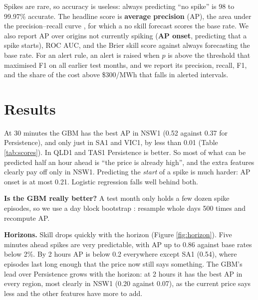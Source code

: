 Spikes are rare, so accuracy is useless: always predicting ``no spike'' is 98 to 99.97\% accurate. The headline score is
\textbf{average precision} (AP), the area under the precision--recall curve \cite{saito2015}, for which a no skill forecast scores
the base rate. We also report AP over origins not currently spiking (\textbf{AP onset}, predicting that a spike starts), ROC AUC,
and the Brier skill score against always forecasting the base rate. For an alert rule, an alert is raised when
$p$ is above the threshold that maximised F1 on all earlier test months, and we report its precision, recall, F1, and the share
of the cost above \$300/MWh that falls in alerted intervals.

\section{Results}
At 30 minutes the GBM has the best AP in NSW1 (0.52 against 0.37 for Persistence), and only just in SA1 and VIC1, by less than
0.01 (Table \ref{tab:scores}). In QLD1 and TAS1 Persistence is better. So most of what can be predicted half an hour ahead is ``the
price is already high'', and the extra features clearly pay off only in NSW1. Predicting the \emph{start} of a spike is much
harder: AP onset is at most 0.21. Logistic regression falls well behind both.

\begin{table}[!htbp]\centering\small
\caption{Out of sample scores 30 minutes ahead, January to September 2026. Best AP per region in bold.}\label{tab:scores}
\resizebox{\textwidth}{!}{}
\end{table}

\textbf{Is the GBM really better?} A test month only holds a few dozen spike episodes, so we use a day block bootstrap
\cite{kunsch1989}: resample whole days 500 times and recompute AP.

\begin{table}[!htbp]\centering\small
\caption{Day block bootstrap of AP, 30 minutes ahead (500 resamples).}\label{tab:bootstrap}
\resizebox{\textwidth}{!}{}
\end{table}

\textbf{Horizons.} Skill drops quickly with the horizon (Figure \ref{fig:horizon}). Five minutes ahead spikes are very
predictable, with AP up to 0.86 against base rates below 2\%. By 2 hours AP is below 0.2 everywhere except SA1 (0.54), where
episodes last long enough that the price now still says something. The GBM's lead over Persistence grows with the horizon: at
2 hours it has the best AP in every region, most clearly in NSW1 (0.20 against 0.07), as the current price says less and the
other features have more to add.

